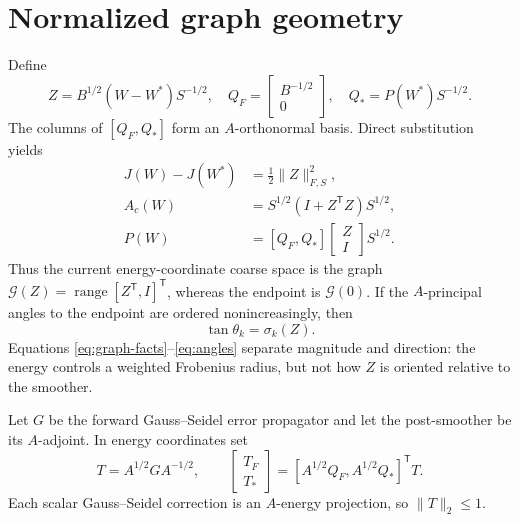 \documentclass[smallextended]{svjour3}
\newcommand{\T}{\mathsf{T}}
\newcommand{\range}{\operatorname{range}}
\newcommand{\cG}{\mathcal{G}}
\newcommand{\norm}[1]{\lVert#1\rVert}
\begin{document}
\section{Normalized graph geometry}\label{sec:geometry}
Define
\begin{equation}\label{eq:Z}
 Z=B^{1/2}(W-W^*)S^{-1/2},\quad
 Q_F=\begin{bmatrix}B^{-1/2}\\0\end{bmatrix},\quad
 Q_*=P(W^*)S^{-1/2}.
\end{equation}
The columns of $[Q_F,Q_*]$ form an $A$-orthonormal basis. Direct substitution yields
\begin{align}\label{eq:graph-facts}
 J(W)-J(W^*)&=\frac12\norm{Z}_{F,S}^2,\\
 A_c(W)&=S^{1/2}(I+Z^{\T}Z)S^{1/2},\\
 P(W)&=[Q_F,Q_*]\begin{bmatrix}Z\\I\end{bmatrix}S^{1/2}.
\end{align}
Thus the current energy-coordinate coarse space is the graph
$\cG(Z)=\range[Z^\T,I]^\T$, whereas the endpoint is $\cG(0)$. If the $A$-principal angles to the endpoint are ordered nonincreasingly, then \cite{knyazev2002angles}
\begin{equation}\label{eq:angles}
 \tan\theta_k=\sigma_k(Z).
\end{equation}
Equations \eqref{eq:graph-facts}--\eqref{eq:angles} separate magnitude and direction: the energy controls a weighted Frobenius radius, but not how $Z$ is oriented relative to the smoother.

Let $G$ be the forward Gauss--Seidel error propagator and let the post-smoother be its $A$-adjoint. In energy coordinates set
\begin{equation}\label{eq:T}
 T=A^{1/2}GA^{-1/2},\qquad
 \begin{bmatrix}T_F\\T_*\end{bmatrix}
 =[A^{1/2}Q_F,A^{1/2}Q_*]^\T T.
\end{equation}
Each scalar Gauss--Seidel correction is an $A$-energy projection, so $\norm{T}_2\le1$.
\end{document}
